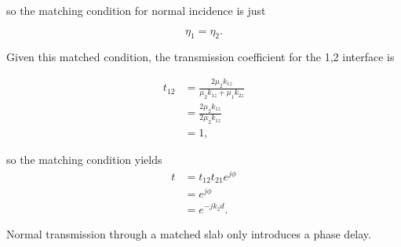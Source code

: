 so the matching condition for normal incidence is just

\begin{dmath}\label{eqn:twoInterfaceNormal:280}
\eta_1 = \eta_2.
\end{dmath}

Given this matched condition, the transmission coefficient for the 1,2 interface is

\begin{dmath}\label{eqn:twoInterfaceNormal:300}
\begin{aligned}
t_{12}
&= \frac{2 \mu_2 k_{1z}}{\mu_2 k_{1z} + \mu_1 k_{2z}} \\
&= \frac{2 \mu_2 k_{1z}}{2 \mu_2 k_{1z} } \\
&= 1,
\end{aligned}
\end{dmath}

so the matching condition yields
\begin{dmath}\label{eqn:twoInterfaceNormal:320}
\begin{aligned}
t
&=
t_{12} t_{21} e^{j\phi} \\
&=
e^{j\phi} \\
&=
e^{-j k_2 d}.
\end{aligned}
\end{dmath}

Normal transmission through a matched slab only introduces a phase delay.

\EndNoBibArticle

